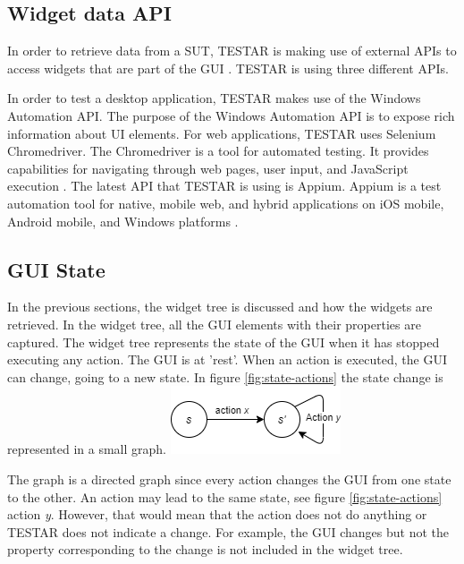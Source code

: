 \subsection{Widget data API}

In order to retrieve data from a SUT, TESTAR is making use of external APIs to access widgets that are part of the GUI \cite{thesisMulders}. TESTAR is using three different APIs.

In order to test a desktop application, TESTAR makes use of the Windows Automation API. The purpose of the Windows Automation API is to expose rich information about UI elements\cite{win-api-info}. For web applications, TESTAR uses Selenium Chromedriver. The Chromedriver is a tool for automated testing. It provides capabilities for navigating through web pages, user input, and JavaScript execution \cite{chrome-driver-info}. The latest API that TESTAR is using is Appium. Appium is a test automation tool for native, mobile web, and hybrid applications on iOS mobile, Android mobile, and Windows platforms \cite{appium-info}.

\subsection{GUI State} \label{gui-state}
In the previous sections, the widget tree is discussed and how the widgets are retrieved. In the widget tree, all the GUI elements with their properties are captured. The widget tree represents the state of the GUI when it has stopped executing any action. The GUI is at 'rest'. When an action is executed, the GUI can change, going to a new state. In figure \ref{fig:state-actions} the state change is represented in a small graph. 
\bigskip
\begingroup
\captionsetup{type=figure}
\includegraphics{images/state-action.png}
\label{fig:state-actions}
\endgroup

The graph is a directed graph since every action changes the GUI from one state to the other. An action may lead to the same state, see figure \ref{fig:state-actions} action \textit{y}. However, that would mean that the action does not do anything or TESTAR does not indicate a change. For example, the GUI changes but not the property corresponding to the change is not included in the widget tree.

